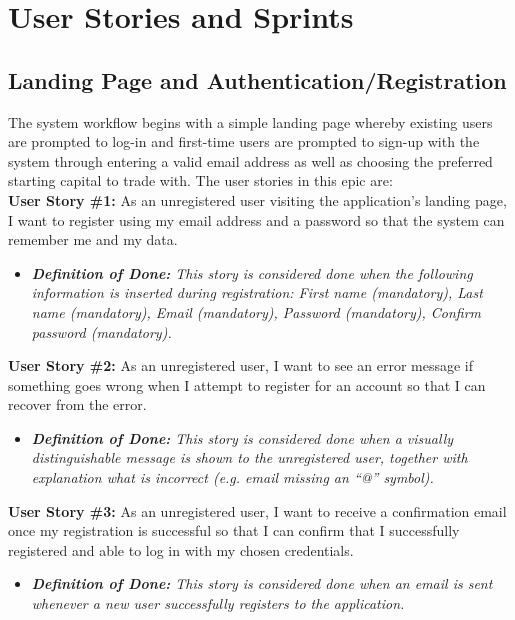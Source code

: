
\section{User Stories and Sprints}
    \label{sec:user_stories}

\subsection{Landing Page and Authentication/Registration}
    \label{subsec:landing_page}
    
The system workflow begins with a simple landing page whereby existing users are prompted to log-in and first-time users are prompted to sign-up with the system through entering a valid email address as well as choosing the preferred starting capital to trade with. The user stories in this epic are:\\

\noindent \textbf{User Story \#1:} As an unregistered user visiting the application’s landing page, I want to register using my email address and a password so that the system can remember me and my data.
\begin{itemize}
	\item \textit{\textbf{Definition of Done:} This story is considered done when the following information is inserted during registration: First name (mandatory), Last name (mandatory), Email (mandatory), Password (mandatory), Confirm password (mandatory).}
\end{itemize}

\noindent \textbf{User Story \#2:} As an unregistered user, I want to see an error message if something goes wrong when I attempt to register for an account so that I can recover from the error.
\begin{itemize}
	\item \textit{\textbf{Definition of Done:} This story is considered done when a visually distinguishable message is shown to the unregistered user, together with explanation what is incorrect (e.g. email missing an “@” symbol).} 
\end{itemize}

\noindent \textbf{User Story \#3:}  As an unregistered user, I want to receive a confirmation email once my registration is successful so that I can confirm that I successfully registered and able to log in with my chosen credentials.
\begin{itemize}
	\item \textit{\textbf{Definition of Done:} This story is considered done when an email is sent whenever a new user successfully registers to the application.} 
\end{itemize}

